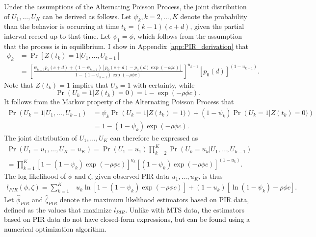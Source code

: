 \documentclass[man, noextraspace, floatsintext]{apa6}\usepackage[]{graphicx}\usepackage[]{color}
\begin{document}
Under the assumptions of the Alternating Poisson Process, the joint distribution of $U_1,...,U_K$ can be derived as follows. 
Let $\psi_k, k = 2,...,K$ denote the probability than the behavior is occurring at time $t_k = (k-1)(c + d)$, given the partial interval record up to that time. 
Let $\psi_1 = \phi$, which follows from the assumption that the process is in equilibrium. I show in Appendix \ref{app:PIR_derivation} that  
\begin{equation}
\label{eq:psi_k}
\begin{aligned}
\psi_k &= \Pr\left[ Z(t_k) = 1 \left| U_1,...,U_{k-1}\right.\right] \\
 &= \left[\frac{\psi_{k-1} p_1(c + d) + (1 - \psi_{k-1}) \left[p_0(c + d) - p_0(d) \exp\left(- \rho \phi c\right)\right]}{1 - (1 - \psi_{k-1})\exp\left( - \rho \phi c \right)}\right]^{u_{k-1}} \left[p_0(d)\right]^{(1 - u_{k-1})}.
\end{aligned}
\end{equation}
Note that $Z(t_k) = 1$ implies that $U_k = 1$ with certainty, while 
\[ \Pr\left(U_k = 1\left| Z(t_k) = 0\right.\right) = 1 - \exp\left(- \rho \phi c\right).\]
It follows from the Markov property of the Alternating Poisson Process that 
\begin{align*}
\Pr\left(U_k = 1 \left| U_1,...,U_{k-1}\right.\right) &= \psi_k \Pr\left(U_k = 1 \left| Z(t_k) = 1)\right.\right)  + (1 - \psi_k)\Pr\left(U_k = 1 \left| Z(t_k) = 0)\right.\right) \\
&= 1 - (1 - \psi_k)\exp\left(- \rho \phi c\right).
\end{align*}
The joint distribution of $U_1,...,U_K$ can therefore be expressed as 
\begin{multline}
\label{eq:PIR_joint}
\Pr\left(U_1 =u_1,...,U_K = u_K\right) = \Pr\left(U_1=u_1\right) \prod_{k=2}^{K}\Pr\left(U_k=u_k \left| U_1,...,U_{k-1}\right.\right)  \\
= \prod_{k=1}^{K} \left[1 - (1 - \psi_k)\exp\left(- \rho \phi c\right) \right]^{u_k} \left[(1 - \psi_k)\exp\left(- \rho \phi c\right)\right]^{(1 - u_k)}.
\end{multline}
The log-likelihood of $\phi$ and $\zeta$, given observed PIR data $u_1,...,u_K$, is thus
\begin{align}
\label{eq:PIR_loglik}
l_{PIR}\left(\phi,\zeta\right) = \sum_{k=1}^{K} & u_k \ln\left[1 - (1 - \psi_k)\exp\left(- \rho \phi c\right)\right]  + (1 - u_k)\left[\ln\left(1 - \psi_k \right) - \rho \phi c\right].
\end{align}
Let $\hat\phi_{PIR}$ and $\hat\zeta_{PIR}$ denote the maximum likelihood estimators based on PIR data, defined as the values that maximize $l_{PIR}$. Unlike with MTS data, the estimators based on PIR data do not have closed-form expressions, but can be found using a numerical optimization algorithm. 
\end{document}
